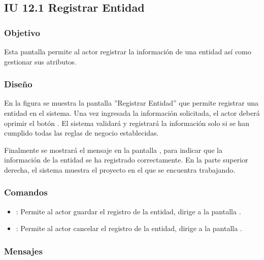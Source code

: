 \subsection{IU 12.1 Registrar Entidad}

\subsubsection{Objetivo}
	Esta pantalla permite al actor registrar la información de una entidad así como gestionar sus atributos.
\subsubsection{Diseño}
	En la figura  se muestra la pantalla ''Registrar Entidad'' que permite registrar una entidad en el sistema.
	Una vez ingresada la información solicitada, el actor deberá oprimir el botón  . El sistema validará y registrará la información solo si se han cumplido todas las reglas de negocio establecidas.
	
	Finalmente se mostrará el mensaje  en la pantalla , para indicar que la información de la entidad se ha registrado correctamente.
	En la parte superior derecha, el sistema muestra el proyecto en el que se encuentra trabajando.

\subsubsection{Comandos}
\begin{itemize}
	\item {}: Permite al actor guardar el registro de la entidad, dirige a la pantalla .
	\item {}: Permite al actor cancelar el registro de la entidad, dirige a la pantalla .
\end{itemize}

\subsubsection{Mensajes}

